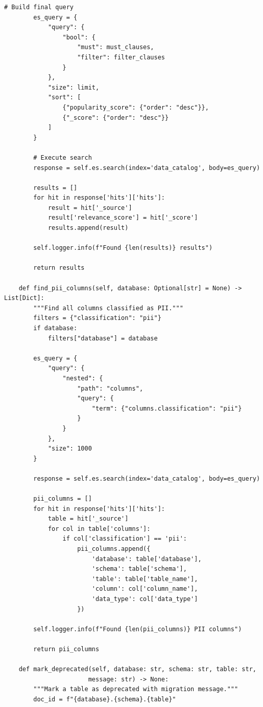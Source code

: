 \begin{lstlisting}[style=python, caption=MetadataCatalog with Automated Metadata Discovery]
        # Build final query
        es_query = {
            "query": {
                "bool": {
                    "must": must_clauses,
                    "filter": filter_clauses
                }
            },
            "size": limit,
            "sort": [
                {"popularity_score": {"order": "desc"}},
                {"_score": {"order": "desc"}}
            ]
        }

        # Execute search
        response = self.es.search(index='data_catalog', body=es_query)

        results = []
        for hit in response['hits']['hits']:
            result = hit['_source']
            result['relevance_score'] = hit['_score']
            results.append(result)

        self.logger.info(f"Found {len(results)} results")

        return results

    def find_pii_columns(self, database: Optional[str] = None) -> List[Dict]:
        """Find all columns classified as PII."""
        filters = {"classification": "pii"}
        if database:
            filters["database"] = database

        es_query = {
            "query": {
                "nested": {
                    "path": "columns",
                    "query": {
                        "term": {"columns.classification": "pii"}
                    }
                }
            },
            "size": 1000
        }

        response = self.es.search(index='data_catalog', body=es_query)

        pii_columns = []
        for hit in response['hits']['hits']:
            table = hit['_source']
            for col in table['columns']:
                if col['classification'] == 'pii':
                    pii_columns.append({
                        'database': table['database'],
                        'schema': table['schema'],
                        'table': table['table_name'],
                        'column': col['column_name'],
                        'data_type': col['data_type']
                    })

        self.logger.info(f"Found {len(pii_columns)} PII columns")

        return pii_columns

    def mark_deprecated(self, database: str, schema: str, table: str,
                       message: str) -> None:
        """Mark a table as deprecated with migration message."""
        doc_id = f"{database}.{schema}.{table}"


\end{lstlisting}
